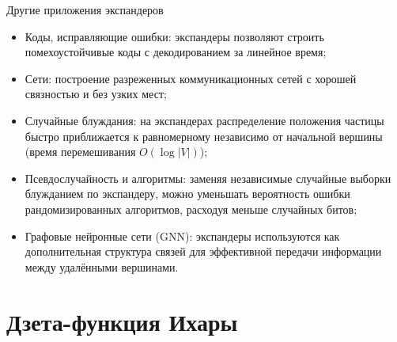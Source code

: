 \documentclass[serif, aspectratio=169]{beamer}
\begin{document}
\begin{frame}{Другие приложения экспандеров}
    \begin{itemize}
        \item Коды, исправляющие ошибки: экспандеры позволяют строить помехоустойчивые коды с декодированием за линейное время;
        \item Сети: построение разреженных коммуникационных сетей с хорошей связностью и без узких мест;
        \item Случайные блуждания: на экспандерах распределение положения частицы быстро приближается к равномерному независимо от начальной вершины (время перемешивания $O(\log |V|)$);
        \item Псевдослучайность и алгоритмы: заменяя независимые случайные выборки блужданием по экспандеру, можно уменьшать вероятность ошибки рандомизированных алгоритмов, расходуя меньше случайных битов;
        \item Графовые нейронные сети (GNN): экспандеры используются как дополнительная структура связей для эффективной передачи информации между удалёнными вершинами.
    \end{itemize}
\end{frame}

\section{Дзета-функция Ихары}
\end{document}
